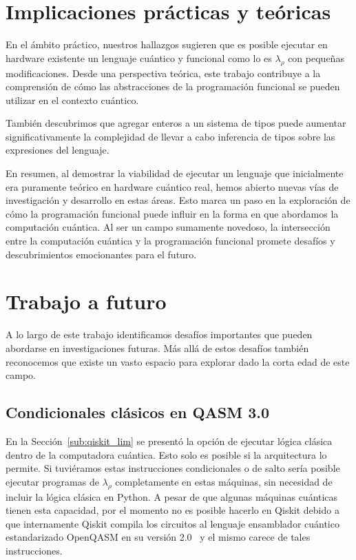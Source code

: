 \section{Implicaciones prácticas y teóricas}

En el ámbito práctico, nuestros hallazgos sugieren que es posible ejecutar en hardware existente un lenguaje cuántico y funcional como lo es $\lambda_\rho$ con pequeñas modificaciones. Desde una perspectiva teórica, este trabajo contribuye a la comprensión de cómo las abstracciones de la programación funcional se pueden utilizar en el contexto cuántico.

También descubrimos que agregar enteros a un sistema de tipos puede aumentar significativamente la complejidad de llevar a cabo inferencia de tipos sobre las expresiones del lenguaje.

En resumen, al demostrar la viabilidad de ejecutar un lenguaje que inicialmente era puramente teórico en hardware cuántico real, hemos abierto nuevas vías de investigación y desarrollo en estas áreas. Esto marca un paso en la exploración de cómo la programación funcional puede influir en la forma en que abordamos la computación cuántica. Al ser un campo sumamente novedoso, la intersección entre la computación cuántica y la programación funcional promete desafíos y descubrimientos emocionantes para el futuro.

\section{Trabajo a futuro}\label{sec:trabajo_futuro}

A lo largo de este trabajo identificamos desafíos importantes que pueden abordarse en investigaciones futuras. Más allá de estos desafíos también reconocemos que existe un vasto espacio para explorar dado la corta edad de este campo.

\subsection{Condicionales clásicos en QASM 3.0}\label{sub:qasm3}

En la Sección~\ref{sub:qiskit_lim} se presentó la opción de ejecutar lógica clásica dentro de la computadora cuántica. Esto solo es posible si la arquitectura lo permite. Si tuviéramos estas instrucciones condicionales o de salto sería posible ejecutar programas de $\lambda_\rho$ completamente en estas máquinas, sin necesidad de incluir la lógica clásica en Python. A pesar de que algunas máquinas cuánticas tienen esta capacidad, por el momento no es posible hacerlo en Qiskit debido a que internamente Qiskit compila los circuitos al lenguaje ensamblador cuántico estandarizado OpenQASM en su versión 2.0~\cite{qiskit_spec} y el mismo carece de tales instrucciones.

